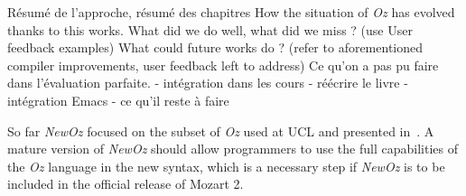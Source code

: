 
Résumé de l'approche, résumé des chapitres
How the situation of \textit{Oz} has evolved thanks to this works.\newline
What did we do well, what did we miss ? (use User feedback examples)\newline
What could future works do ? (refer to aforementioned compiler improvements, user feedback left to address)\newline
Ce qu'on a pas pu faire dans l'évaluation parfaite.\newline
- intégration dans les cours
- réécrire le livre
- intégration Emacs
- ce qu'il reste à faire

So far \textit{NewOz} focused on the subset of \textit{Oz} used at UCL and presented in~\cite{van2004concepts}.
A mature version of \textit{NewOz} should allow programmers to use the full capabilities of the \textit{Oz} language in the new syntax, which is a necessary step if \textit{NewOz} is to be included in the official release of Mozart 2.